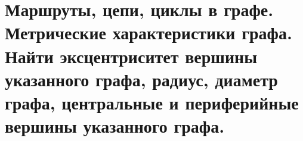 \section{Маршруты, цепи, циклы в графе. Метрические характеристики графа. Найти эксцентриситет 
вершины указанного графа, радиус, диаметр графа, центральные и периферийные вершины 
указанного графа.}